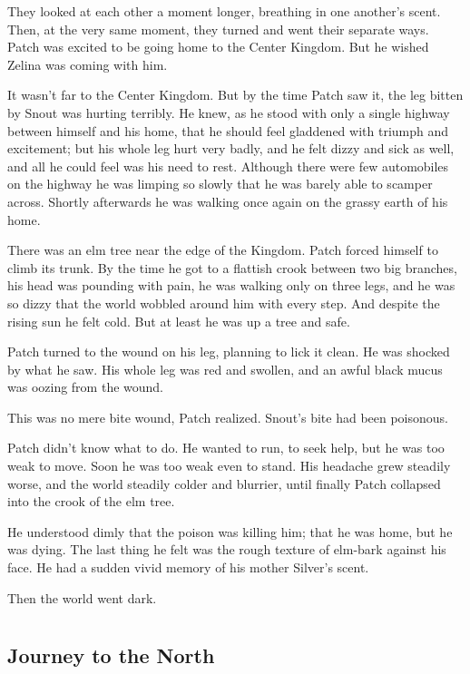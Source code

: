\documentclass[12pt]{book}
\begin{document}
They looked at each other a moment longer, breathing in one another's
scent. Then, at the very same moment, they turned and went their
separate ways. Patch was excited to be going home to the Center
Kingdom. But he wished Zelina was coming with him.

It wasn't far to the Center Kingdom. But by the time Patch saw it, the
leg bitten by Snout was hurting terribly. He knew, as he stood with
only a single highway between himself and his home, that he should
feel gladdened with triumph and excitement; but his whole leg hurt
very badly, and he felt dizzy and sick as well, and all he could feel
was his need to rest. Although there were few automobiles on the
highway he was limping so slowly that he was barely able to scamper
across. Shortly afterwards he was walking once again on the grassy
earth of his home.

There was an elm tree near the edge of the Kingdom. Patch forced
himself to climb its trunk. By the time he got to a flattish crook
between two big branches, his head was pounding with pain, he was
walking only on three legs, and he was so dizzy that the world wobbled
around him with every step. And despite the rising sun he felt
cold. But at least he was up a tree and safe.

Patch turned to the wound on his leg, planning to lick it clean. He
was shocked by what he saw. His whole leg was red and swollen, and an
awful black mucus was oozing from the wound.

This was no mere bite wound, Patch realized. Snout's bite had been
poisonous.

Patch didn't know what to do. He wanted to run, to seek help, but he
was too weak to move. Soon he was too weak even to stand. His headache
grew steadily worse, and the world steadily colder and blurrier, until
finally Patch collapsed into the crook of the elm tree.

He understood dimly that the poison was killing him; that he was home,
but he was dying. The last thing he felt was the rough texture of
elm-bark against his face. He had a sudden vivid memory of his mother
Silver's scent.

Then the world went dark.


\part{}

\chapter{Journey to the North}
\end{document}
